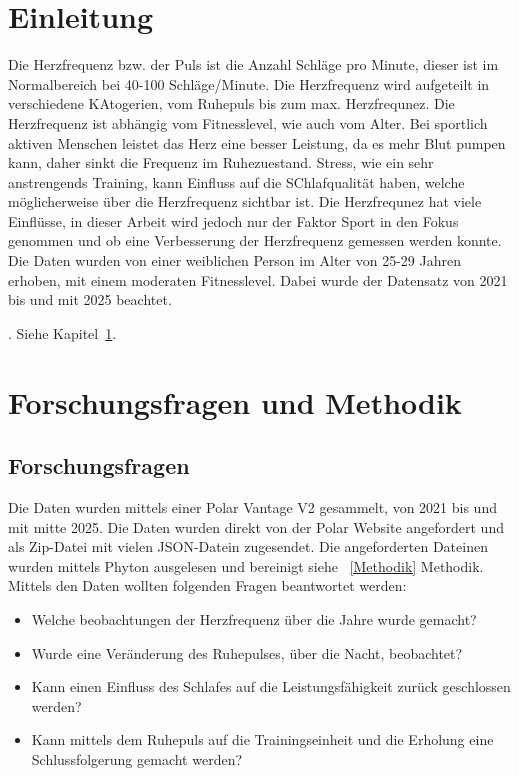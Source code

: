 \documentclass[a4paper,12pt]{scrartcl}
\begin{document}
 

\clearpage

\section{Einleitung}
\label{Kap1}
Die Herzfrequenz bzw. der Puls ist die Anzahl Schläge pro Minute, dieser ist im Normalbereich bei 40-100 Schläge/Minute. Die Herzfrequenz wird aufgeteilt in verschiedene KAtogerien, vom Ruhepuls bis zum max. Herzfrequnez. Die Herzfrequenz ist abhängig vom Fitnesslevel, wie auch vom Alter. Bei sportlich aktiven Menschen leistet das Herz eine besser Leistung, da es mehr Blut pumpen kann, daher sinkt die Frequenz im Ruhezuestand. Stress, wie ein sehr anstrengends Training, kann Einfluss auf die SChlafqualität haben, welche möglicherweise über die Herzfrequenz sichtbar ist. 
Die Herzfrequnez hat viele Einflüsse, in dieser Arbeit wird jedoch nur der Faktor Sport in den Fokus genommen und ob eine Verbesserung der Herzfrequenz gemessen werden konnte. 
Die Daten wurden von einer weiblichen Person im Alter von 25-29 Jahren erhoben, mit einem moderaten Fitnesslevel. Dabei wurde der Datensatz von 2021 bis und mit 2025 beachtet. 



\cite{Student2022}. 
Siehe Kapitel~\ref{Kap1}.

\section{Forschungsfragen und Methodik}
\subsection{Forschungsfragen}
Die Daten wurden mittels einer Polar Vantage V2 gesammelt, von 2021 bis und mit mitte 2025. Die Daten wurden direkt von der Polar Website angefordert und als Zip-Datei mit vielen JSON-Datein zugesendet. Die angeforderten Dateinen wurden mittels Phyton ausgelesen und bereinigt siehe ~\ref{Methodik} Methodik.
Mittels den Daten wollten folgenden Fragen beantwortet werden:
\begin{itemize}
    \item Welche beobachtungen der Herzfrequenz über die Jahre wurde gemacht?
    \item Wurde eine Veränderung des Ruhepulses, über die Nacht, beobachtet?
    \item Kann einen Einfluss des Schlafes auf die Leistungsfähigkeit zurück geschlossen werden?
    \item Kann mittels dem Ruhepuls auf die Trainingseinheit und die Erholung eine Schlussfolgerung gemacht werden?
\end{itemize}
\end{document}
